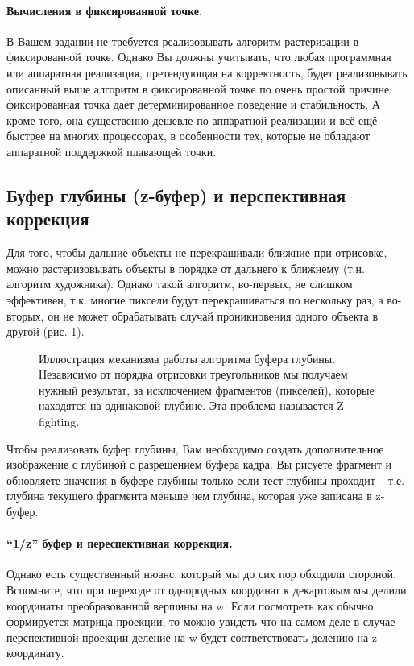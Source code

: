 \documentclass[12pt,subf,href,colorlinks=true]{article}
\begin{document}
\FloatBarrier

\paragraph{Вычисления в фиксированной точке.} В Вашем задании не требуется реализовывать алгоритм растеризации в фиксированной точке. Однако Вы должны учитывать, что любая программная или аппаратная реализация, претендующая на корректность, будет реализовывать описанный выше алгоритм в фиксированной точке по очень простой причине: фиксированная точка даёт детерминированное поведение и стабильность. А кроме того, она существенно дешевле по аппаратной реализации и всё ещё быстрее на многих процессорах, в особенности тех, которые не обладают аппаратной поддержкой плавающей точки.

\subsection{Буфер глубины (z-буфер) и перспективная коррекция}

Для того, чтобы дальние объекты не перекрашивали ближние при отрисовке, можно растеризовывать объекты в порядке от дальнего к ближнему (т.н. алгоритм художника). Однако такой алгоритм, во-первых, не слишком эффективен, т.к. многие пиксели будут перекрашиваться по нескольку раз, а во-вторых, он не может обрабатывать случай проникновения одного объекта в другой (рис. \ref{fig:zbuffer}).

\begin{figure}[h]
	\caption{Иллюстрация механизма работы алгоритма буфера глубины. Независимо от порядка отрисовки треугольников мы получаем нужный результат, за исключением фрагментов (пикселей), которые находятся на одинаковой глубине. Эта проблема называется Z-fighting.}
	\label{fig:zbuffer}
\end{figure}

Чтобы реализовать буфер глубины, Вам необходимо создать дополнительное изображение с глубиной с разрешением буфера кадра. Вы рисуете фрагмент и обновляете значения в буфере глубины только если тест глубины проходит -- т.е. глубина текущего фрагмента меньше чем глубина, которая уже записана в z-буфер.

\paragraph{``1/z'' буфер и переспективная коррекция.} Однако есть существенный нюанс, который мы до сих пор обходили стороной. Вспомните, что при переходе от однородных координат к декартовым мы делили координаты преобразованной вершины на w. Если посмотреть как обычно формируется матрица проекции, то можно увидеть что на самом деле в случае перспективной проекции деление на w будет соответствовать делению на z координату.
\end{document}
